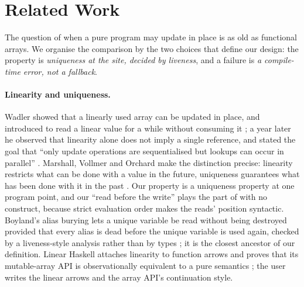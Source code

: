 \section{Related Work}
\label{sec:related}

The question of when a pure program may update in place is as old as functional arrays. We organise the
comparison by the two choices that define our design: the property is \emph{uniqueness at the site,
decided by liveness}, and a failure is \emph{a compile-time error, not a fallback}.

\paragraph{Linearity and uniqueness.} Wadler showed that a linearly used array can be updated in place,
and introduced  to read a linear value for a while without consuming it
\citep{wadler1990linear}; a year later he observed that linearity alone does not imply a single
reference, and stated the goal that ``only update operations are sequentialised but lookups can occur in
parallel'' \citep{wadler1991use}. Marshall, Vollmer and Orchard make the distinction precise: linearity
restricts what can be done with a value in the future, uniqueness guarantees what has been done with it
in the past \citep{marshall2022entente}. Our property is a uniqueness property at one program point,
and our ``read before the write'' plays the part of  with no construct, because strict
evaluation order makes the reads' position syntactic. Boyland's alias burying lets a unique variable be
read without being destroyed provided that every alias is dead before the unique variable is used again,
checked by a liveness-style analysis rather than by types \citep{boyland2001alias}; it is the closest
ancestor of our definition. Linear Haskell attaches linearity to function arrows and proves that its
mutable-array API is observationally equivalent to a pure semantics \citep{bernardy2018linear}; the user
writes the linear arrows and the array API's continuation style.

